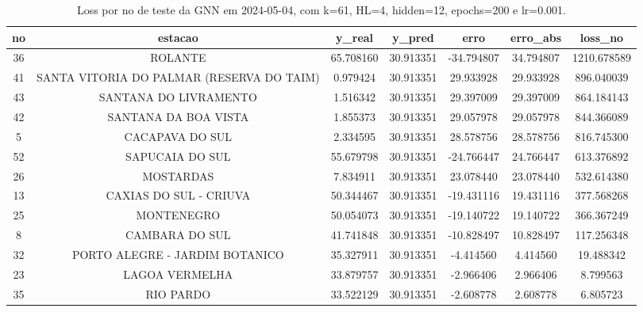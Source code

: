 \begin{table}[h]
\centering
\caption{Loss por no de teste da GNN em 2024-05-04, com k=61, HL=4, hidden=12, epochs=200 e lr=0.001.}
\label{tab:gnn_loss_k61_hl4_h12_e200_d20240504}
\begin{tabular}{ccccccc}
\toprule
no & estacao & y\_real & y\_pred & erro & erro\_abs & loss\_no \\
\midrule
36 & ROLANTE & 65.708160 & 30.913351 & -34.794807 & 34.794807 & 1210.678589 \\
41 & SANTA VITORIA DO PALMAR (RESERVA DO TAIM) & 0.979424 & 30.913351 & 29.933928 & 29.933928 & 896.040039 \\
43 & SANTANA DO LIVRAMENTO & 1.516342 & 30.913351 & 29.397009 & 29.397009 & 864.184143 \\
42 & SANTANA DA BOA VISTA & 1.855373 & 30.913351 & 29.057978 & 29.057978 & 844.366089 \\
5 & CACAPAVA DO SUL & 2.334595 & 30.913351 & 28.578756 & 28.578756 & 816.745300 \\
52 & SAPUCAIA DO SUL & 55.679798 & 30.913351 & -24.766447 & 24.766447 & 613.376892 \\
26 & MOSTARDAS & 7.834911 & 30.913351 & 23.078440 & 23.078440 & 532.614380 \\
13 & CAXIAS DO SUL - CRIUVA & 50.344467 & 30.913351 & -19.431116 & 19.431116 & 377.568268 \\
25 & MONTENEGRO & 50.054073 & 30.913351 & -19.140722 & 19.140722 & 366.367249 \\
8 & CAMBARA DO SUL & 41.741848 & 30.913351 & -10.828497 & 10.828497 & 117.256348 \\
32 & PORTO ALEGRE - JARDIM BOTANICO & 35.327911 & 30.913351 & -4.414560 & 4.414560 & 19.488342 \\
23 & LAGOA VERMELHA & 33.879757 & 30.913351 & -2.966406 & 2.966406 & 8.799563 \\
35 & RIO PARDO & 33.522129 & 30.913351 & -2.608778 & 2.608778 & 6.805723 \\
\bottomrule
\end{tabular}
\end{table}
